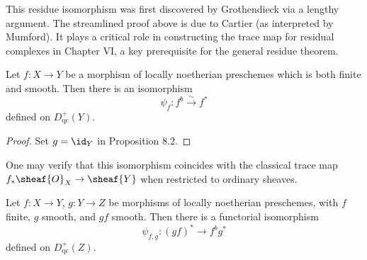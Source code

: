 \setcounter{page}{186}
\begin{remark}
This residue isomorphism was first discovered by Grothendieck via a lengthy argument. The streamlined proof above is due to Cartier (as interpreted by Mumford). It plays a critical role in constructing the trace map for residual complexes in Chapter VI, a key prerequisite for the general residue theorem.
\end{remark}

\begin{corollary}
Let \(f\colon X\to Y\) be a morphism of locally noetherian preschemes which is both finite and smooth. Then there is an isomorphism
\[
\psi_f\colon f^b \stackrel{\sim}{\to} f^*
\]
defined on \(D_{\mathrm{qc}}^+(Y)\).
\end{corollary}

\begin{proof}
Set \(g=\id_Y\) in Proposition 8.2.
\end{proof}

\setcounter{page}{187}
\begin{remark}
One may verify that this isomorphism coincides with the classical trace map \(f_*\sheaf{O}_X\to\sheaf{Y}\) when restricted to ordinary sheaves.
\end{remark}

\begin{proposition}
Let \(f\colon X\to Y\), \(g\colon Y\to Z\) be morphisms of locally noetherian preschemes, with \(f\) finite, \(g\) smooth, and \(gf\) smooth. Then there is a functorial isomorphism
\[
\psi_{f,g}\colon (gf)^* \to f^b g^*
\]
defined on \(D_{\mathrm{qc}}^+(Z)\).
\end{proposition}

